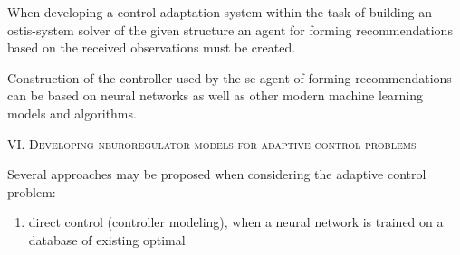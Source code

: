\documentclass{article}
\begin{document}
\begin{minipage}[t]{0.45\textwidth}
    \hspace{0.2cm} When developing a control adaptation system within the task of building an ostis-system solver of the given structure an agent for forming recommendations based on the received observations must be created.

    \hspace{0.2cm} Construction of the controller used by the sc-agent of forming recommendations can be based on neural networks as well as other modern machine learning models and algorithms.
    \begin{center}
    \textsc{VI. Developing neuroregulator models for adaptive control problems}
    \end{center}
    \hspace{0.2cm} Several approaches may be proposed when considering the adaptive control problem:

 \begin{enumerate}[label={\arabic*)}, noitemsep]
    \item direct control (controller modeling), when a neural network is trained on a database of existing optimal
 \end{enumerate}

\end{minipage}

\newpage
\end{document}
